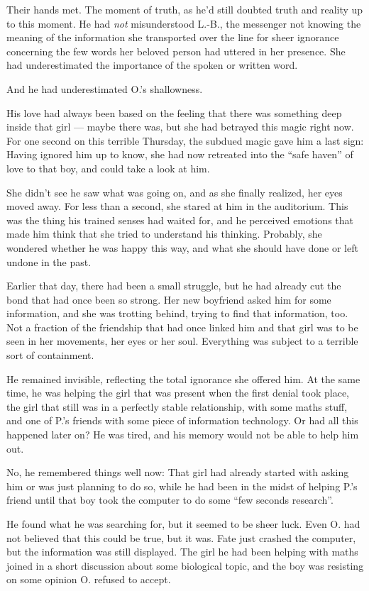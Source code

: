 Their hands met. The moment of truth, as he'd still doubted truth and reality up to this moment. He had \emph{not} misunderstood L.-B., the messenger not knowing the meaning of the information she transported over the line for sheer ignorance concerning the few words her beloved person had uttered in her presence. She had underestimated the importance of the spoken or written word.

And he had underestimated O.'s shallowness. 

His love had always been based on the feeling that there was something deep inside that girl --- maybe there was, but she had betrayed this magic right now. For one second on this terrible Thursday, the subdued magic gave him a last sign: Having ignored him up to know, she had now retreated into the \enquote{safe haven} of love to that boy, and could take a look at him.

She didn't see he saw what was going on, and as she finally realized, her eyes moved away. For less than a second, she stared at him in the auditorium. This was the thing his trained senses had waited for, and he perceived emotions that made him think that she tried to understand his thinking. Probably, she wondered whether he was happy this way, and what she should have done or left undone in the past.

Earlier that day, there had been a small struggle, but he had already cut the bond that had once been so strong. Her new boyfriend asked him for some information, and she was trotting behind, trying to find that information, too. Not a fraction of the friendship that had once linked him and that girl was to be seen in her movements, her eyes or her soul. Everything was subject to a terrible sort of containment.

He remained invisible, reflecting the total ignorance she offered him. At the same time, he was helping the girl that was present when the first denial took place, the girl that still was in a perfectly stable relationship, with some maths stuff, and one of P.'s friends with some piece of information technology. Or had all this happened later on? He was tired, and his memory would not be able to help him out.

No, he remembered things well now: That girl had already started with asking him or was just planning to do so, while he had been in the midst of helping P.'s friend until that boy took the computer to do some \enquote{few seconds research}.

He found what he was searching for, but it seemed to be sheer luck. Even O. had not believed that this could be true, but it was. Fate just crashed the computer, but the information was still displayed. 
The girl he had been helping with maths joined in a short discussion about some biological topic, and the boy was resisting on some opinion O. refused to accept. 

